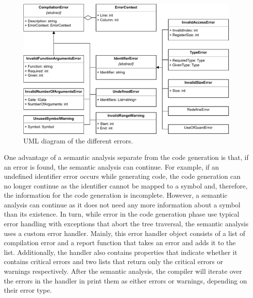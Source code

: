 \begin{figure}[htp]
    \centering
    \includegraphics[width=.9\textwidth]{../figures/uml_errors.pdf}
    \caption{UML diagram of the different errors.}
    \label{fig:implementation_uml_errors}
\end{figure}

One advantage of a semantic analysis separate from the code generation is that, if an error is found, the semantic analysis can continue. For example, if an undefined identifier error occurs while generating code, the code generation can no longer continue as the identifier cannot be mapped to a symbol and, therefore, the information for the code generation is incomplete. However, a semantic analysis can continue as it does not need any more information about a symbol than its existence. In turn, while error in the code generation phase use typical error handling with exceptions that abort the tree traversal, the semantic analysis uses a custom error handler. Mainly, this error handler object consists of a list of compilation error and a report function that takes an error and adds it to the list. Additionally, the handler also contains properties that indicate whether it contains critical errors and two lists that return only the critical errors or warnings respectively. After the semantic analysis, the compiler will iterate over the errors in the handler in print them as either errors or warnings, depending on their error type.